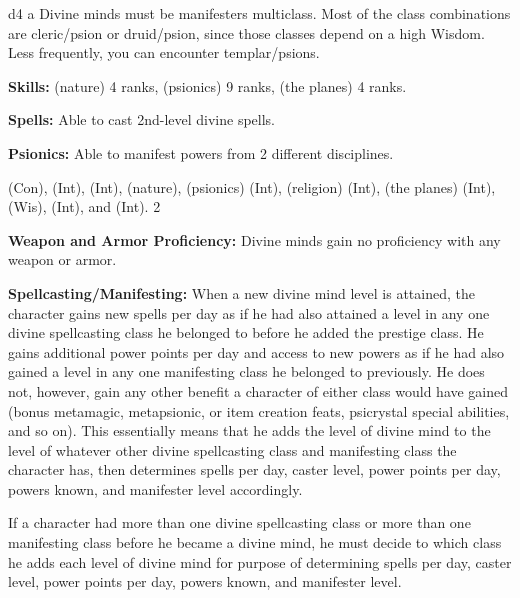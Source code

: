 {d4}
{a}
{Divine minds must be manifesters multiclass. Most of the class combinations are cleric/psion or druid/psion, since those classes depend on a high Wisdom. Less frequently, you can encounter templar/psions.}
{
\textbf{Skills:}  (nature) 4 ranks,  (psionics) 9 ranks,  (the planes) 4 ranks.

\textbf{Spells:} Able to cast 2nd-level divine spells.

\textbf{Psionics:} Able to manifest powers from 2 different disciplines.
}
{
 (Con),  (Int),  (Int),  (nature),  (psionics) (Int),  (religion) (Int),  (the planes) (Int),  (Wis),  (Int), and  (Int).
}
{2}
{}{}
{
\textbf{Weapon and Armor Proficiency:} Divine minds gain no proficiency with any weapon or armor.

\textbf{Spellcasting/Manifesting:} When a new divine mind level is attained, the character gains new spells per day as if he had also attained a level in any one divine spellcasting class he belonged to before he added the prestige class. He gains additional power points per day and access to new powers as if he had also gained a level in any one manifesting class he belonged to previously. He does not, however, gain any other benefit a character of either class would have gained (bonus metamagic, metapsionic, or item creation feats, psicrystal special abilities, and so on). This essentially means that he adds the level of divine mind to the level of whatever other divine spellcasting class and manifesting class the character has, then determines spells per day, caster level, power points per day, powers known, and manifester level accordingly.

If a character had more than one divine spellcasting class or more than one manifesting class before he became a divine mind, he must decide to which class he adds each level of divine mind for purpose of determining spells per day, caster level, power points per day, powers known, and manifester level.
}
